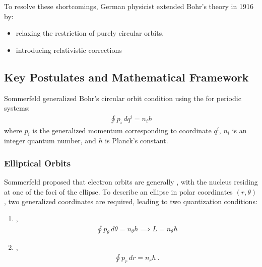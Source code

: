 \documentclass[letterpaper,10pt,english]{jupyterBook}
\begin{document}
\sphinxAtStartPar
To resolve these shortcomings, German physicist  extended Bohr’s theory in 1916 by:
\begin{itemize}
\item {} 
\sphinxAtStartPar
relaxing the restriction of purely circular orbits.

\item {} 
\sphinxAtStartPar
introducing relativistic corrections

\end{itemize}


\subsection{Key Postulates and Mathematical Framework}
\label{\detokenize{ch/quantum-mechanics/atom-models/sommerfeld:key-postulates-and-mathematical-framework}}
\sphinxAtStartPar
Sommerfeld generalized Bohr’s circular orbit condition using the  for periodic systems:
\begin{equation*}
\begin{split}\oint p_i \, dq^i = n_i h\end{split}
\end{equation*}
\sphinxAtStartPar
where \(p_i\) is the generalized momentum corresponding to coordinate \(q^i\), \(n_i\) is an integer quantum number, and \(h\) is Planck’s constant.


\subsubsection{Elliptical Orbits}
\label{\detokenize{ch/quantum-mechanics/atom-models/sommerfeld:elliptical-orbits}}
\sphinxAtStartPar
Sommerfeld proposed that electron orbits are generally , with the nucleus residing at one of the foci of the ellipse. To describe an ellipse in polar coordinates \((r, \theta)\), two generalized coordinates are required, leading to two quantization conditions:
\begin{enumerate}
%
\item {} 
\sphinxAtStartPar
{},
\begin{equation*}
\begin{split}\oint p_\theta \, d\theta = n_\theta h \implies L = n_\theta \hbar\end{split}
\end{equation*}
\item {} 
\sphinxAtStartPar
{},
\begin{equation*}
\begin{split}\oint p_r \, dr = n_r h \ .\end{split}
\end{equation*}
\end{enumerate}
\end{document}
